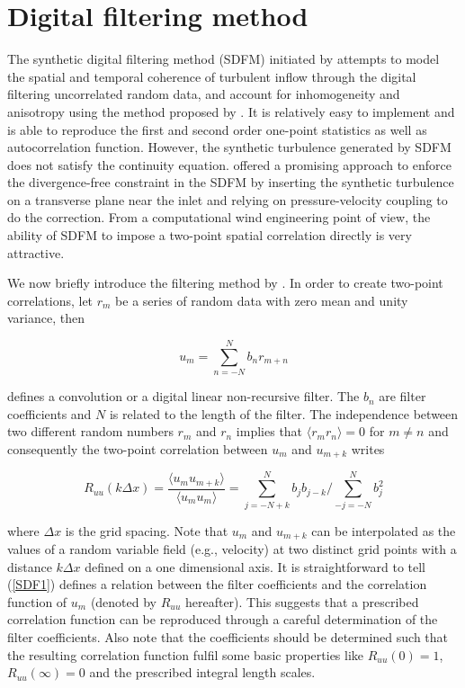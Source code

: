 \section{Digital filtering method} \label{section4}

The synthetic digital filtering method (SDFM) initiated by \cite{klein2003} attempts to model the spatial and temporal coherence of turbulent inflow through the digital filtering uncorrelated random data, and account for inhomogeneity and anisotropy using the method proposed by \cite{lund1998}. It is relatively easy to implement and is able to reproduce the first and second order one-point statistics as well as autocorrelation function. However, the synthetic turbulence generated by SDFM does not satisfy the continuity equation. \cite{kim2013} offered a promising approach to enforce the divergence-free constraint in the SDFM by inserting the synthetic turbulence on a transverse plane near the inlet and relying on pressure-velocity coupling to do the correction. From a computational wind engineering point of view, the ability of SDFM to impose a two-point spatial correlation directly is very attractive.

We now briefly introduce the filtering method by \cite{klein2003}. In order to create two-point correlations, let $r_m$ be a series of random data with zero mean and unity variance, then

\begin{equation}
u_m = \sum_{n=-N}^N b_n r_{m+n}
\end{equation}

\noindent defines a convolution or a digital linear non-recursive filter. The $b_n$ are filter coefficients and $N$ is related to the length of the filter. The independence between two different random numbers $r_m$ and $r_n$ implies that $\langle r_m r_n \rangle = 0$ for $m \neq n$ and consequently the two-point correlation between $u_{m}$ and $u_{m+k}$ writes

\begin{equation} \label{SDF1}
R_{uu}(k\varDelta x) = \frac{\langle u_{m} u_{m+k} \rangle}{\langle u_{m} u_{m} \rangle} = \sum_{j=-N+k}^N b_j b_{j-k} / \sum_{-j=-N}^N b_j^2
\end{equation}

\noindent where $\varDelta x$ is the grid spacing. Note that $u_{m}$ and $u_{m+k}$ can be interpolated as the values of a random variable field (e.g., velocity) at two distinct grid points with a distance $k\varDelta x$ defined on a one dimensional axis. It is straightforward to tell (\ref{SDF1}) defines a relation between the filter coefficients and the correlation function of $u_m$ (denoted by $R_{uu}$ hereafter). This suggests that a prescribed correlation function can be reproduced through a careful determination of the filter coefficients. Also note that the coefficients should be determined such that the resulting correlation function fulfil some basic properties like $R_{uu}(0)=1$, $R_{uu}(\infty) = 0$ and the prescribed integral length scales.

